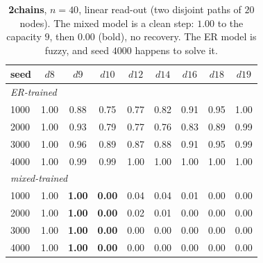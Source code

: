\documentclass[11pt,a4paper]{article}
\begin{document}
\begin{table}[H]\centering\small
\begin{tabular}{lcccccccc}
\toprule
seed & $d8$ & $d9$ & $d10$ & $d12$ & $d14$ & $d16$ & $d18$ & $d19$ \\
\midrule
\multicolumn{9}{l}{\emph{ER-trained}}\\
1000 & 1.00 & 0.88 & 0.75 & 0.77 & 0.82 & 0.91 & 0.95 & 1.00 \\
2000 & 1.00 & 0.93 & 0.79 & 0.77 & 0.76 & 0.83 & 0.89 & 0.99 \\
3000 & 1.00 & 0.96 & 0.89 & 0.87 & 0.88 & 0.91 & 0.95 & 0.99 \\
4000 & 1.00 & 0.99 & 0.99 & 1.00 & 1.00 & 1.00 & 1.00 & 1.00 \\
\midrule
\multicolumn{9}{l}{\emph{mixed-trained}}\\
1000 & 1.00 & \textbf{1.00} & \textbf{0.00} & 0.04 & 0.04 & 0.01 & 0.00 & 0.00 \\
2000 & 1.00 & \textbf{1.00} & \textbf{0.00} & 0.02 & 0.01 & 0.00 & 0.00 & 0.00 \\
3000 & 1.00 & \textbf{1.00} & \textbf{0.00} & 0.00 & 0.00 & 0.00 & 0.00 & 0.00 \\
4000 & 1.00 & \textbf{1.00} & \textbf{0.00} & 0.00 & 0.00 & 0.00 & 0.00 & 0.00 \\
\bottomrule\end{tabular}
\caption{\textbf{2chains}, $n=40$, linear read-out (two disjoint paths of $20$ nodes). The mixed model is a clean
step: $1.00$ to the capacity $9$, then $0.00$ (bold), no recovery. The ER model is fuzzy, and
seed $4000$ happens to solve it.}
\label{tab:n40_2chains}
\end{table}
\end{document}

